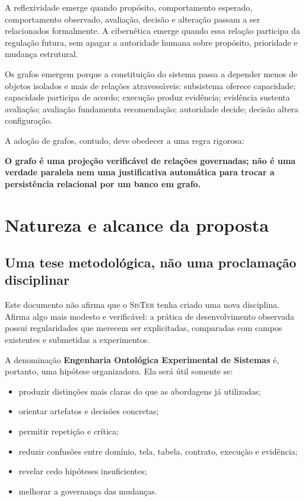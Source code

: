 \documentclass[11pt,a4paper,oneside]{article}
\newcommand{\termo}[1]{\textbf{#1}}
\newcommand{\sister}{\textsc{SisTer}}
\begin{document}
A reflexividade emerge quando propósito, comportamento esperado, comportamento observado, avaliação, decisão e alteração passam a ser relacionados formalmente. A cibernética emerge quando essa relação participa da regulação futura, sem apagar a autoridade humana sobre propósito, prioridade e mudança estrutural.

Os grafos emergem porque a constituição do sistema passa a depender menos de objetos isolados e mais de relações atravessáveis: subsistema oferece capacidade; capacidade participa de acordo; execução produz evidência; evidência sustenta avaliação; avaliação fundamenta recomendação; autoridade decide; decisão altera configuração.

A adoção de grafos, contudo, deve obedecer a uma regra rigorosa:

\begin{principio}
\centering
\textbf{O grafo é uma projeção verificável de relações governadas; não é uma verdade paralela nem uma justificativa automática para trocar a persistência relacional por um banco em grafo.}
\end{principio}

\section{Natureza e alcance da proposta}

\subsection{Uma tese metodológica, não uma proclamação disciplinar}

Este documento não afirma que o \sister{} tenha criado uma nova disciplina. Afirma algo mais modesto e verificável: a prática de desenvolvimento observada possui regularidades que merecem ser explicitadas, comparadas com campos existentes e submetidas a experimentos.

A denominação \termo{Engenharia Ontológica Experimental de Sistemas} é, portanto, uma hipótese organizadora. Ela será útil somente se:

\begin{itemize}
  \item produzir distinções mais claras do que as abordagens já utilizadas;
  \item orientar artefatos e decisões concretas;
  \item permitir repetição e crítica;
  \item reduzir confusões entre domínio, tela, tabela, contrato, execução e evidência;
  \item revelar cedo hipóteses insuficientes;
  \item melhorar a governança das mudanças.
\end{itemize}
\end{document}
